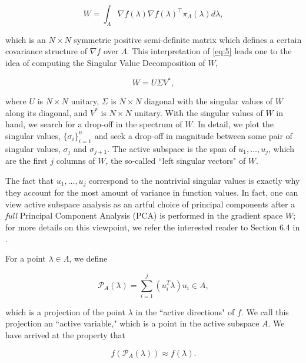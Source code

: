 \documentclass{amsart}
\begin{document}
\begin{equation} \label{eq:5}
W=\int_\Lambda \nabla f(\lambda) \nabla f(\lambda)^\top  \pi_\Lambda(\lambda) d\lambda,
\end{equation} 

\noindent which is an $N\times N$ symmetric positive semi-definite matrix which defines a certain covariance structure of $\nabla f$ over $\Lambda$. This interpretation of \eqref{eq:5} leads one to the idea of computing the Singular Value Decomposition of $W$,

\begin{equation} \label{eq:6}
W=U\Sigma V^*,
\end{equation} 

\noindent where $U$ is $N \times N$ unitary, $\Sigma$ is $N \times N$ diagonal with the singular values of $W$ along its diagonal, and $V^*$ is $N \times N$ unitary. With the singular values of $W$ in hand, we search for a drop-off in the spectrum of $W$. In detail, we plot the singular values, $\{\sigma_i\}_{i=1}^n$ and seek a drop-off in magnitude between some pair of singular values, $\sigma_{j}$ and $\sigma_{j+1}$. The active subspace is the span of $u_1,\ldots,u_{j}$, which are the first $j$ columns of $W$, the so-called ``left singular vectors" of $W$. 

The fact that $u_1,\ldots,u_{j}$ correspond to the nontrivial singular values is exactly why they account for the most amount of variance in function values. In fact, one can view active subspace analysis as an artful choice of principal components after a \textit{full} Principal Component Analysis (PCA) is performed in the gradient space $W$; for more details on this viewpoint, we refer the interested reader to Section 6.4 in \cite{Russi}.

For a point $\lambda \in \Lambda$, we define

\begin{equation} \label{eq:7}
  \mathcal{P}_A(\lambda)=\sum_{i=1}^{j}\left( u_i^T \lambda\right)u_i \in A, 
\end{equation}

\noindent which is a projection of the point $\lambda$ in the ``active directions" of $f$. We call this projection an ``active variable," which is a point in the active subspace $A$. We have arrived at the property that 

\begin{equation} \label{eq:8}
f\left(\mathcal{P}_A(\lambda)\right) \approx f(\lambda).
\end{equation}
\end{document}
